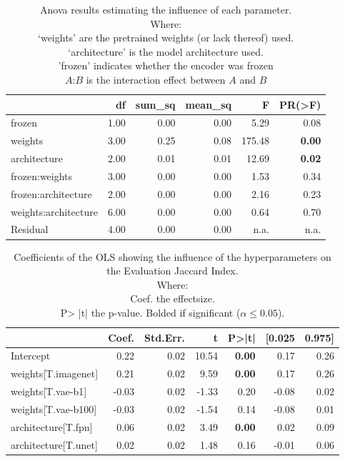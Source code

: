 \begin{table}[ht]
\caption{Anova results estimating the influence of each parameter.\\Where: \\\hphantom{tabb}`weights' are the pretrained weights (or lack thereof) used.\\\hphantom{tabb}`architecture' is the model architecture used.\\\hphantom{tabb}'frozen' indicates whether the encoder was frozen\\\hphantom{tabb}$A$:$B$ is the interaction effect between $A$ and $B$}
\label{tab:comparison_baselines_anova_all}
\begin{tabular}{lrrrrr}
\toprule
 & df & sum\_sq & mean\_sq & F & PR(>F) \\
\midrule
frozen & 1.00 & 0.00 & 0.00 & 5.29 & 0.08 \\
weights & 3.00 & 0.25 & 0.08 & 175.48 & \textbf{0.00} \\
architecture & 2.00 & 0.01 & 0.01 & 12.69 & \textbf{0.02} \\
frozen:weights & 3.00 & 0.00 & 0.00 & 1.53 & 0.34 \\
frozen:architecture & 2.00 & 0.00 & 0.00 & 2.16 & 0.23 \\
weights:architecture & 6.00 & 0.00 & 0.00 & 0.64 & 0.70 \\
Residual & 4.00 & 0.00 & 0.00 & n.a. & n.a. \\
\bottomrule
\end{tabular}
\end{table}


\begin{table}[ht]
\caption{Coefficients of the OLS showing the influence of the hyperparameters on the Evaluation Jaccard Index.\\Where:\\\hphantom{tabb}Coef. the effectsize.\\\hphantom{tabb}P> |t| the p-value. Bolded if significant ($\alpha\le0.05$).}
\label{tab:comparison_baselines_ols_effects}
\begin{tabular}{lrrrrrr}
\toprule
 & Coef. & Std.Err. & t & P>|t| & [0.025 & 0.975] \\
\midrule
Intercept & 0.22 & 0.02 & 10.54 & \textbf{0.00} & 0.17 & 0.26 \\
weights[T.imagenet] & 0.21 & 0.02 & 9.59 & \textbf{0.00} & 0.17 & 0.26 \\
weights[T.vae-b1] & -0.03 & 0.02 & -1.33 & 0.20 & -0.08 & 0.02 \\
weights[T.vae-b100] & -0.03 & 0.02 & -1.54 & 0.14 & -0.08 & 0.01 \\
architecture[T.fpn] & 0.06 & 0.02 & 3.49 & \textbf{0.00} & 0.02 & 0.09 \\
architecture[T.unet] & 0.02 & 0.02 & 1.48 & 0.16 & -0.01 & 0.06 \\
\bottomrule
\end{tabular}
\end{table}
